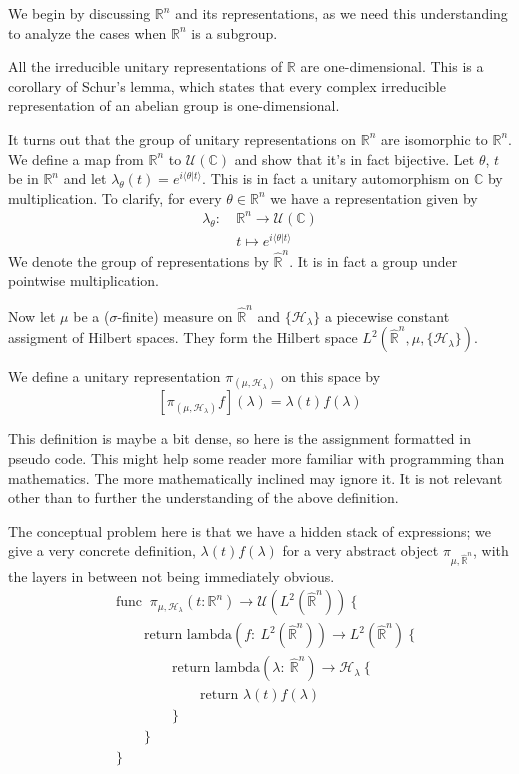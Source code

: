\documentclass[
  12pt
]{article}
\theoremstyle{plain}
\newcommand{\bbr}{\ensuremath{\mathbb{R}}\xspace}
\newcommand{\hilb}{\ensuremath{\mathscr{H}}\xspace}
\begin{document}
  We begin by discussing $\bbr^n$ and its representations, as we need this understanding to analyze the cases when $\bbr^n$ is a subgroup.

  All the irreducible unitary representations of \bbr are one-dimensional.
  This is a corollary of Schur's lemma, which states that every complex
  irreducible representation of an abelian group is one-dimensional.

  It turns out that the group of unitary representations on $\mathbb{R}^n$
  are isomorphic to $\mathbb{R}^n$.
  We define a map from $\mathbb{R}^n$ to $\mathcal{U}(\mathbb{C})$ and show that it's in
  fact bijective. Let $\theta$, $t$ be in $\mathbb{R}^n$ and let
  $\lambda_{\theta}(t) = e^{i\langle \theta | t \rangle}$. This is in
  fact a unitary automorphism on $\mathbb{C}$ by multiplication. To
  clarify, for every $\theta \in \mathbb{R}^n$ we have a representation
  given by
  \begin{align*}
    \lambda_{\theta}:\ & \mathbb{R}^n \rightarrow \mathcal{U}(\mathbb{C}) \\
    & t \mapsto e^{i \langle \theta | t \rangle}
  \end{align*}
  We denote the group of representations by $\hat{\mathbb{R}}^n$. It
  is in fact a group under pointwise multiplication.

  Now let $\mu$ be a ($\sigma$-finite) measure on $\hat{\bbr}^n$ and
  $\{\hilb_{\lambda}\}$ a piecewise constant assigment of Hilbert spaces. They
  form the Hilbert space $L^2(\hat{\bbr}^n, \mu, \{\hilb_{\lambda}\})$.

  We define a unitary representation $\pi_{(\mu, \hilb_{\lambda})}$ on this space by
  $$
    [\pi_{(\mu, \hilb_{\lambda})} f](\lambda) = \lambda(t)f(\lambda)
  $$

  This definition is maybe a bit dense, so here is the assignment formatted in
  pseudo code. This might help some reader more familiar with programming than
  mathematics. The more mathematically inclined may ignore it. It is not
  relevant other than to further the understanding of the above definition.

  The conceptual problem here is that we have a hidden stack of expressions; we
  give a very concrete definition, $\lambda(t)f(\lambda)$ for a very abstract
  object $\pi_{\mu, \hat{\bbr}^n}$, with the layers in between not being
  immediately obvious.
  \begin{align*}
  & \text{func }\ \pi_{\mu,\mathscr{H}_{\lambda}}(t: \mathbb{R}^n) \rightarrow \mathcal{U}(L^2(\hat{\mathbb{R}}^n)) \ \{ \\
  & \qquad \text{return lambda}(f:\ L^2(\hat{\mathbb{R}}^n)) \rightarrow L^2(\hat{\mathbb{R}}^n) \ \{ \\
  & \qquad \qquad \text{return lambda}(\lambda:\ \hat{\mathbb{R}}^n) \rightarrow \mathscr{H}_{\lambda} \ \{ \\
  & \qquad \qquad \qquad \text{return }\lambda(t)f(\lambda) \\
  & \qquad \qquad \} \\
  & \qquad \} \\
  & \} \\
  \end{align*}
\end{document}

